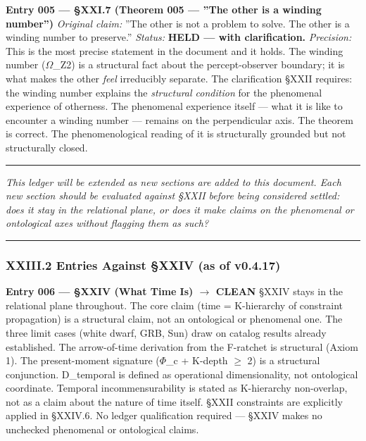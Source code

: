 \documentclass[12pt,a4paper]{article}
\begin{document}
\textbf{Entry 005 --- §XXI.7 (Theorem 005 --- ''The other is a winding number'')}
\emph{Original claim:} ''The other is not a problem to solve. The other is a winding number to preserve.''
\emph{Status:} \textbf{HELD --- with clarification.}
\emph{Precision:} This is the most precise statement in the document and it holds. The winding number ($\Omega$\_Z2) is a structural fact about the percept-observer boundary; it is what makes the other \emph{feel} irreducibly separate. The clarification §XXII requires: the winding number explains the \emph{structural condition} for the phenomenal experience of otherness. The phenomenal experience itself --- what it is like to encounter a winding number --- remains on the perpendicular axis. The theorem is correct. The phenomenological reading of it is structurally grounded but not structurally closed.

\begin{center}
\rule{0.5\textwidth}{0.4pt}
\end{center}

\emph{This ledger will be extended as new sections are added to this document. Each new section should be evaluated against §XXII before being considered settled: does it stay in the relational plane, or does it make claims on the phenomenal or ontological axes without flagging them as such?}

\begin{center}
\rule{0.5\textwidth}{0.4pt}
\end{center}

\subsubsection{XXIII.2 Entries Against §XXIV (as of v0.4.17)}

\textbf{Entry 006 --- §XXIV (What Time Is) $\rightarrow$ CLEAN}
§XXIV stays in the relational plane throughout. The core claim (time = K-hierarchy of constraint propagation) is a structural claim, not an ontological or phenomenal one. The three limit cases (white dwarf, GRB, Sun) draw on catalog results already established. The arrow-of-time derivation from the F-ratchet is structural (Axiom 1). The present-moment signature ($\Phi$\_c + K-depth $\geq$ 2) is a structural conjunction. D\_temporal is defined as operational dimensionality, not ontological coordinate. Temporal incommensurability is stated as K-hierarchy non-overlap, not as a claim about the nature of time itself. §XXII constraints are explicitly applied in §XXIV.6. No ledger qualification required --- §XXIV makes no unchecked phenomenal or ontological claims.
\end{document}
